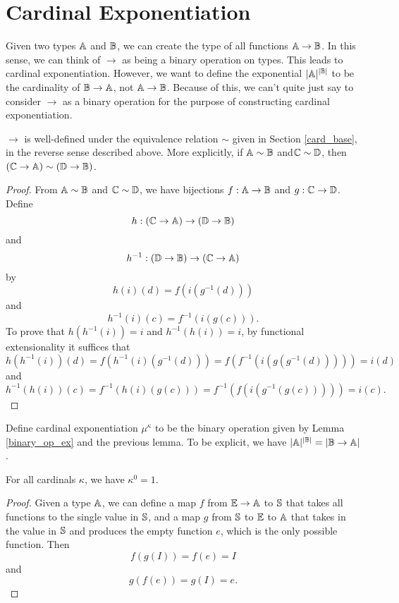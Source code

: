 \documentclass[../../math.tex]{subfiles}
\begin{document}
\section{Cardinal Exponentiation}

Given two types $\A$ and $\B$, we can create the type of all functions $\A \to
\B$.  In this sense, we can think of $\to$ as being a binary operation on types.
This leads to cardinal exponentiation.  However, we want to define the
exponential $|\A|^{|\B|}$ to be the cardinality of $\B \to \A$, not $\A \to \B$.
Because of this, we can't quite just say to consider $\to$ as a binary
operation for the purpose of constructing cardinal exponentiation.

\begin{lemma}
    $\to$ is well-defined under the equivalence relation $\sim$ given in Section
    \ref{card_base}, in the reverse sense described above.  More explicitly, if
    $\A \sim \B$ and$\C \sim \D$, then $(\C \to \A) \sim (\D \to \B)$.
\end{lemma}
\begin{proof}
    From $\A \sim \B$ and $\C \sim \D$, we have bijections $f : \A \to \B$ and
    $g : \C \to \D$.  Define
    \[
        h : (\C \to \A) \to (\D \to \B)
    \]
    and
    \[
        h^{-1} : (\D \to \B) \to (\C \to \A)
    \]
    by
    \[
        h(i)(d) = f(i(g^{-1}(d)))
    \]
    and
    \[
        h^{-1}(i)(c) = f^{-1}(i(g(c))).
    \]
    To prove that $h(h^{-1}(i)) = i$ and $h^{-1}(h(i)) = i$, by functional
    extensionality it suffices that
    \[
        h(h^{-1}(i))(d)
        = f(h^{-1}(i)(g^{-1}(d)))
        = f(f^{-1}(i(g(g^{-1}(d)))))
        = i(d)
    \]
    and
    \[
        h^{-1}(h(i))(c)
        = f^{-1}(h(i)(g(c)))
        = f^{-1}(f(i(g^{-1}(g(c)))))
        = i(c).
    \]
\end{proof}

\begin{definition}
    Define cardinal exponentiation $\mu^\kappa$ to be the binary operation given
    by Lemma \ref{binary_op_ex} and the previous lemma.  To be explicit, we have
    $|\A|^{|\B|} = |\B \to \A|$.
\end{definition}

\begin{theorem}
    For all cardinals $\kappa$, we have $\kappa^0 = 1$.
\end{theorem}
\begin{proof}
    Given a type $\A$, we can define a map $f$ from $\E \to \A$ to $\S$ that
    takes all functions to the single value in $\S$, and a map $g$ from $\S$ to
    $\E$ to $\A$ that takes in the value in $\S$ and produces the empty
    function $e$, which is the only possible function.  Then
    \[
        f(g(I)) = f(e) = I
    \]
    and
    \[
        g(f(e)) = g(I) = e.
    \]
\end{proof}
\end{document}
